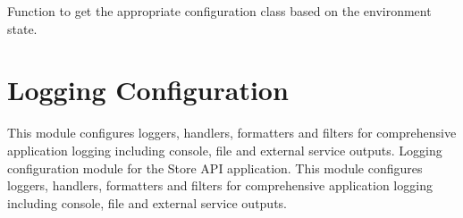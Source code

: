 \documentclass[letterpaper,10pt,openany,oneside,english]{sphinxmanual}
\begin{document}

\begin{savenotes}\begin{fulllineitems}
\label{\detokenize{modules/config:storeapi.config.get_config}}
\pysigstartsignatures
{}
\pysigstopsignatures
\sphinxAtStartPar
Function to get the appropriate configuration class based on the environment state.

\end{fulllineitems}\end{savenotes}



\section{Logging Configuration}
\label{\detokenize{modules/config:logging-configuration}}
\sphinxAtStartPar
This module configures loggers, handlers, formatters and filters
for comprehensive application logging including console, file
and external service outputs.
\label{\detokenize{modules/config:module-storeapi.logging_conf}}
\sphinxAtStartPar
Logging configuration module for the Store API application.
This module configures loggers, handlers, formatters and filters
for comprehensive application logging including console, file
and external service outputs.
\end{document}
